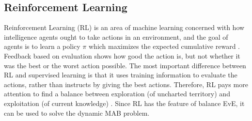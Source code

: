 \documentclass[journal]{IEEEtran}
\begin{document}
\subsection{Reinforcement Learning}
Reinforcement Learning (RL) \cite{sutton2018reinforcement} is an area of machine learning concerned with how intelligence agents ought to take actions in an environment, and the goal of agents is to learn a policy $\pi$ which maximizes the expected cumulative reward \cite{van2012reinforcement}.
Feedback based on evaluation shows how good the action is, but not whether it was the best or the worst action possible.
The most important difference between RL and supervised learning is that it uses training information to evaluate the actions, rather than instructs by giving the best actions.
Therefore, RL pays more attention to find a balance between exploration (of uncharted territory) and exploitation (of current knowledge) \cite{kaelbling1996reinforcement}.
Since RL has the feature of balance EvE, it can be used to solve the dynamic MAB problem.
\end{document}
